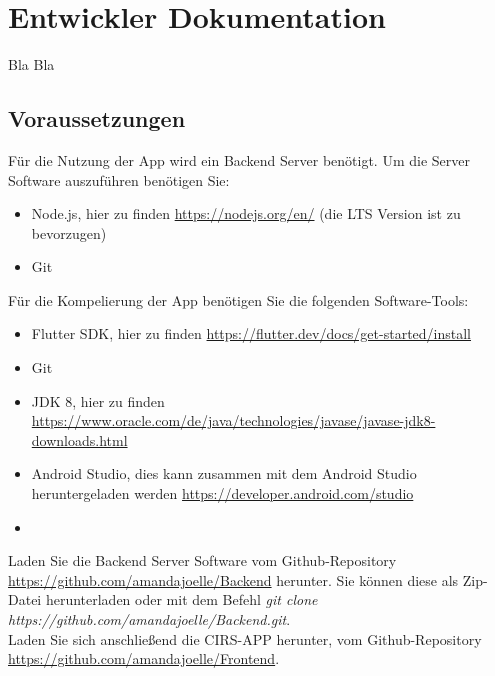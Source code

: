 \chapter{Entwickler Dokumentation}
\label{entw_docu}
Bla Bla

\section{Voraussetzungen}
\label{voraussertungen}
Für die Nutzung der App wird ein Backend Server benötigt. Um die Server Software auszuführen benötigen Sie:
\begin{itemize}
\item Node.js, hier zu finden \url{https://nodejs.org/en/} (die LTS Version ist zu bevorzugen)
\item Git
\end{itemize}
Für die Kompelierung der App benötigen Sie die folgenden Software-Tools:
\begin{itemize}
\item Flutter SDK, hier zu finden \url{https://flutter.dev/docs/get-started/install}
\item Git
\item JDK 8, hier zu finden \url{https://www.oracle.com/de/java/technologies/javase/javase-jdk8-downloads.html}
\item Android Studio, dies kann zusammen mit dem Android Studio heruntergeladen werden \url{https://developer.android.com/studio}
\item 
\end{itemize}
Laden Sie die Backend Server Software vom Github-Repository \url{https://github.com/amandajoelle/Backend} herunter. Sie können diese als Zip-Datei herunterladen oder mit dem Befehl \textit{git clone https://github.com/amandajoelle/Backend.git}.\\
Laden Sie sich anschließend die CIRS-APP herunter, vom Github-Repository \url{https://github.com/amandajoelle/Frontend}.

